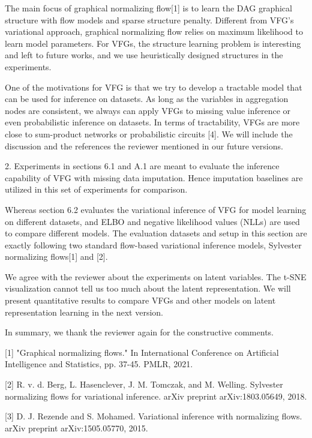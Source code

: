 \documentclass{article}
\begin{document}
The main focus of graphical normalizing flow[1] is to learn the DAG graphical structure with flow models and sparse structure penalty.
Different from VFG's variational approach, graphical normalizing flow relies on maximum likelihood to learn model parameters. For VFGs,  the structure learning problem is interesting and left to future works, and we use heuristically designed structures in the experiments. 

One of the motivations for VFG is that we try to develop a tractable model that can be used for inference on datasets. As long as the variables in aggregation nodes are consistent, we always can apply VFGs to missing value inference or even probabilistic inference on datasets. In terms of tractability, VFGs are more close to sum-product networks or probabilistic circuits [4]. We will include the discussion and the references the reviewer mentioned in our future versions. 


2. Experiments in sections 6.1 and A.1 are meant to evaluate the inference capability of VFG with missing data imputation.   
Hence imputation baselines are utilized in this set of experiments for comparison.  

Whereas section 6.2 evaluates the variational inference of  VFG  for model learning on different datasets,  and  ELBO and negative likelihood values (NLLs)   are used to compare different models. The evaluation datasets and setup in this section are exactly following two standard flow-based variational inference models, Sylvester normalizing flows[1] and [2].

We agree with the reviewer about the experiments on latent variables. The t-SNE visualization cannot tell us too much about the latent representation. We will present quantitative results to compare VFGs and other models on latent representation learning in the next version.


In summary, we thank the reviewer again for the constructive comments. 


[1] "Graphical normalizing flows." In International Conference on Artificial Intelligence and Statistics, pp. 37-45. PMLR, 2021.

 [2] R. v. d. Berg, L. Hasenclever, J. M. Tomczak, and M. Welling. Sylvester normalizing flows for variational inference. arXiv preprint arXiv:1803.05649, 2018.
 
 [3] D. J. Rezende and S. Mohamed. Variational inference with normalizing flows. arXiv preprint arXiv:1505.05770, 2015.
 
\end{document}
